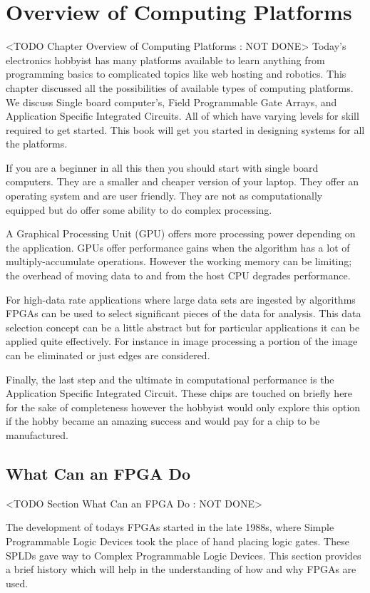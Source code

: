 \chapter{Overview of Computing Platforms}
	<TODO Chapter Overview of Computing Platforms : NOT DONE>
Today's electronics hobbyist has many platforms available to learn anything from programming basics to complicated topics like web hosting and robotics. This chapter discussed all the possibilities of available types of computing platforms. We discuss Single board computer's, Field Programmable Gate Arrays, and Application Specific Integrated Circuits. All of which have varying levels for skill required to get started. This book will get you started in designing systems for all the platforms.  

If you are a beginner in all this then you should start with single board computers. They are a smaller and cheaper version of your laptop. They offer an operating system and are user friendly. They are not as computationally equipped but do offer some ability to do complex processing. 

A Graphical Processing Unit (GPU) offers more processing power depending on the application. GPUs offer performance gains when the algorithm has a lot of multiply-accumulate operations. However the working memory can be limiting; the overhead of moving data to and from the host CPU degrades performance.

For high-data rate applications where large data sets are ingested by algorithms FPGAs can be used to select significant pieces of the data for analysis. This data selection concept can be a little abstract but for particular applications it can be applied quite effectively. For instance in image processing a portion of the image can be eliminated or just edges are considered. 

Finally, the last step and the ultimate in computational performance is the Application Specific Integrated Circuit. These chips are touched on briefly here for the sake of completeness however the hobbyist would only explore this option if the hobby became an amazing success and would pay for a chip to be manufactured. 
	
	
\section{What Can an FPGA Do}
	<TODO Section What Can an FPGA Do : NOT DONE>

The development of todays FPGAs started in the late 1988s, where Simple Programmable Logic Devices took the place of hand placing logic gates. These SPLDs gave way to Complex Programmable Logic Devices. This section provides a brief history which will help in the understanding of how and why FPGAs are used.  	
	

